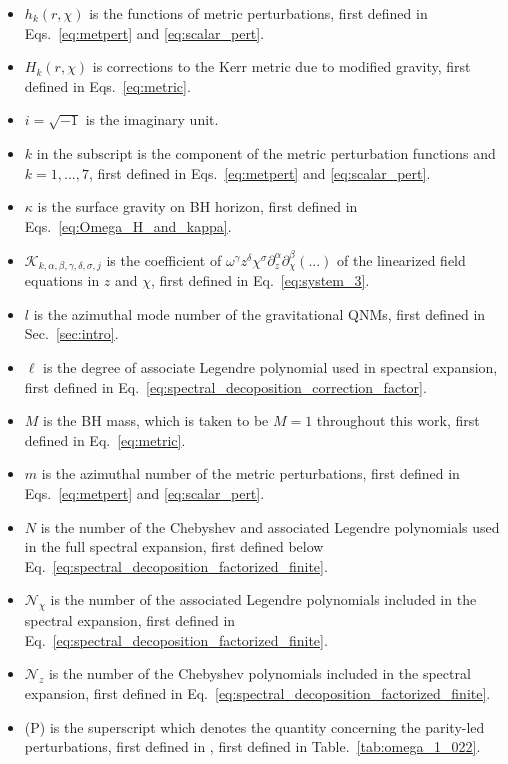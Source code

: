 \documentclass[aps,prx,amsmath,floats,floatfix,twocolumn,
  superscriptaddress,nofootinbib,showpacs]{revtex4-1}
\begin{document}
\begin{itemize}
    \item $h_k(r, \chi)$ is the functions of metric perturbations, first defined in Eqs.~\eqref{eq:metpert} and \eqref{eq:scalar_pert}. 
    \item $H_k(r, \chi)$ is corrections to the Kerr metric due to modified gravity, first defined in Eqs.~\eqref{eq:metric}. 
    \item $i = \sqrt{-1}$ is the imaginary unit. 
    \item $k$ in the subscript is the component of the metric perturbation functions and $k= 1, ..., 7$, first defined in Eqs.~\eqref{eq:metpert} and \eqref{eq:scalar_pert}.
    \item $\kappa$ is the surface gravity on BH horizon, first defined in Eqs.~\eqref{eq:Omega_H_and_kappa}.
    \item $\mathcal{K}_{k, \alpha, \beta, \gamma, \delta, \sigma, j} $ is the coefficient of $\omega^\gamma z^{\delta} \chi^{\sigma} \partial_{z}^{\alpha} \partial_{\chi}^{\beta}(...)$ of the linearized field equations in $z$ and $\chi$, first defined in Eq.~\eqref{eq:system_3}. 
    \item $l$ is the azimuthal mode number of the gravitational QNMs, first defined in Sec.~\ref{sec:intro}. 
    \item $\ell$ is the degree of associate Legendre polynomial used in spectral expansion, first defined in Eq.~\eqref{eq:spectral_decoposition_correction_factor}.
    \item $M$ is the BH mass, which is taken to be $M=1$ throughout this work, first defined in Eq.~\eqref{eq:metric}. 
    \item $m$ is the azimuthal number of the metric perturbations, first defined in Eqs.~\eqref{eq:metpert} and \eqref{eq:scalar_pert}. 
    \item $N$ is the number of the Chebyshev and associated Legendre polynomials used in the full spectral expansion, first defined below  Eq.~\eqref{eq:spectral_decoposition_factorized_finite}. 
    \item $\mathcal{N}_{\chi}$ is the number of the associated Legendre polynomials included in the spectral expansion, first defined in Eq.~\eqref{eq:spectral_decoposition_factorized_finite}. 
    \item $\mathcal{N}_{z}$ is the number of the Chebyshev polynomials included in the spectral expansion, first defined in Eq.~\eqref{eq:spectral_decoposition_factorized_finite}. 
    \item (P) is the superscript which denotes the quantity concerning the parity-led perturbations, first defined in , first defined in Table.~\ref{tab:omega_1_022}.

\end{itemize}
\end{document}
